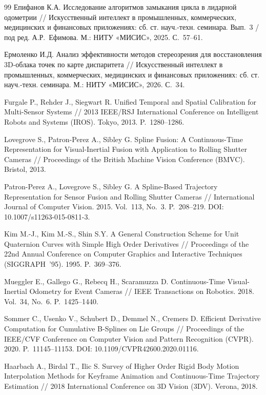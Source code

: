 \documentclass{misisarticle}
\begin{document}
\begin{thebibliography}{99}
 Епифанов К.А. Исследование алгоритмов замыкания цикла в лидарной одометрии // Искусственный интеллект в промышленных, коммерческих, медицинских и финансовых приложениях: сб. ст. науч.-техн. семинара. Вып.~3 / под ред. А.Р.~Ефимова. М.: НИТУ «МИСИС», 2025. С.~57--61.

 Ермоленко И.Д. Анализ эффективности методов стереозрения для восстановления 3D-облака точек по карте диспаритета // Искусственный интеллект в промышленных, коммерческих, медицинских и финансовых приложениях: сб. ст. науч.-техн. семинара. М.: НИТУ «МИСИС», 2026. С.~34.

 Furgale P., Rehder J., Siegwart R. Unified Temporal and Spatial Calibration for Multi-Sensor Systems // 2013 IEEE/RSJ International Conference on Intelligent Robots and Systems (IROS). Tokyo, 2013. P.~1280--1286.

 Lovegrove S., Patron-Perez A., Sibley G. Spline Fusion: A Continuous-Time Representation for Visual-Inertial Fusion with Application to Rolling Shutter Cameras // Proceedings of the British Machine Vision Conference (BMVC). Bristol, 2013.

 Patron-Perez A., Lovegrove S., Sibley G. A Spline-Based Trajectory Representation for Sensor Fusion and Rolling Shutter Cameras // International Journal of Computer Vision. 2015. Vol.~113, No.~3. P.~208--219. DOI: 10.1007/s11263-015-0811-3.

 Kim M.-J., Kim M.-S., Shin S.Y. A General Construction Scheme for Unit Quaternion Curves with Simple High Order Derivatives // Proceedings of the 22nd Annual Conference on Computer Graphics and Interactive Techniques (SIGGRAPH~'95). 1995. P.~369--376.

 Mueggler E., Gallego G., Rebecq H., Scaramuzza D. Continuous-Time Visual-Inertial Odometry for Event Cameras // IEEE Transactions on Robotics. 2018. Vol.~34, No.~6. P.~1425--1440.

 Sommer C., Usenko V., Schubert D., Demmel N., Cremers D. Efficient Derivative Computation for Cumulative B-Splines on Lie Groups // Proceedings of the IEEE/CVF Conference on Computer Vision and Pattern Recognition (CVPR). 2020. P.~11145--11153. DOI: 10.1109/CVPR42600.2020.01116.

 Haarbach A., Birdal T., Ilic S. Survey of Higher Order Rigid Body Motion Interpolation Methods for Keyframe Animation and Continuous-Time Trajectory Estimation // 2018 International Conference on 3D Vision (3DV). Verona, 2018.


\end{thebibliography}
\end{document}
